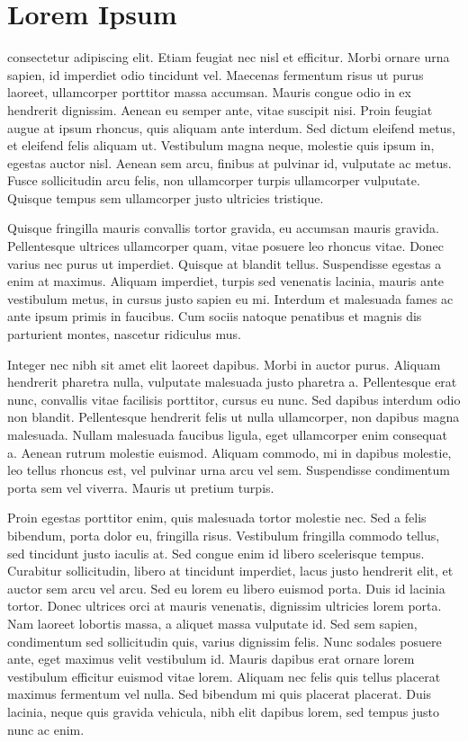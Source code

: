 \section{Lorem Ipsum}

consectetur adipiscing elit. Etiam feugiat nec nisl et efficitur. Morbi ornare urna sapien, id imperdiet odio tincidunt vel. Maecenas fermentum risus ut purus laoreet, ullamcorper porttitor massa accumsan. Mauris congue odio in ex hendrerit dignissim. Aenean eu semper ante, vitae suscipit nisi. Proin feugiat augue at ipsum rhoncus, quis aliquam ante interdum. Sed dictum eleifend metus, et eleifend felis aliquam ut. Vestibulum magna neque, molestie quis ipsum in, egestas auctor nisl. Aenean sem arcu, finibus at pulvinar id, vulputate ac metus. Fusce sollicitudin arcu felis, non ullamcorper turpis ullamcorper vulputate. Quisque tempus sem ullamcorper justo ultricies tristique.

Quisque fringilla mauris convallis tortor gra\-vida, eu accumsan mauris gravida. Pellentesque ultrices ullamcorper quam, vitae posuere leo rhoncus vitae. Donec varius nec purus ut imperdiet. Quisque at blandit tellus. Suspendisse egestas a enim at maximus. Aliquam imperdiet, turpis sed venenatis lacinia, mauris ante vestibulum metus, in cursus justo sapien eu mi. Interdum et malesuada fames ac ante ipsum primis in faucibus. Cum sociis natoque penatibus et magnis dis parturient montes, nascetur ridiculus mus.

Integer nec nibh sit amet elit laoreet dapibus. Morbi in auctor purus. Aliquam hendrerit pharetra nulla, vulputate malesuada justo pharetra a. Pellentesque erat nunc, convallis vitae facilisis porttitor, cursus eu nunc. Sed dapibus interdum odio non blandit. Pellentesque hendrerit felis ut nulla ullamcorper, non dapibus magna malesuada. Nullam malesuada faucibus ligula, eget ullamcorper enim consequat a. Aenean rutrum molestie euismod. Aliquam commodo, mi in dapibus molestie, leo tellus rhoncus est, vel pulvinar urna arcu vel sem. Suspendisse condimentum porta sem vel viverra. Mauris ut pretium turpis.

Proin egestas porttitor enim, quis malesuada tortor molestie nec. Sed a felis bibendum, porta dolor eu, fringilla risus. Vestibulum fringilla commodo tellus, sed tincidunt justo iaculis at. Sed congue enim id libero scelerisque tempus. Curabitur sollicitudin, libero at tincidunt imperdiet, lacus justo hendrerit elit, et auctor sem arcu vel arcu. Sed eu lorem eu libero euismod porta. Duis id lacinia tortor. Donec ultrices orci at mauris venenatis, dignissim ultricies lorem porta. Nam laoreet lobortis massa, a aliquet massa vulputate id. Sed sem sapien, condimentum sed sollicitudin quis, varius dignissim felis. Nunc sodales posuere ante, eget maximus velit vestibulum id. Mauris dapibus erat ornare lorem vestibulum efficitur euismod vitae lorem. Aliquam nec felis quis tellus placerat maximus fermentum vel nulla. Sed bibendum mi quis placerat placerat. Duis lacinia, neque quis gravida vehicula, nibh elit dapibus lorem, sed tempus justo nunc ac enim.


